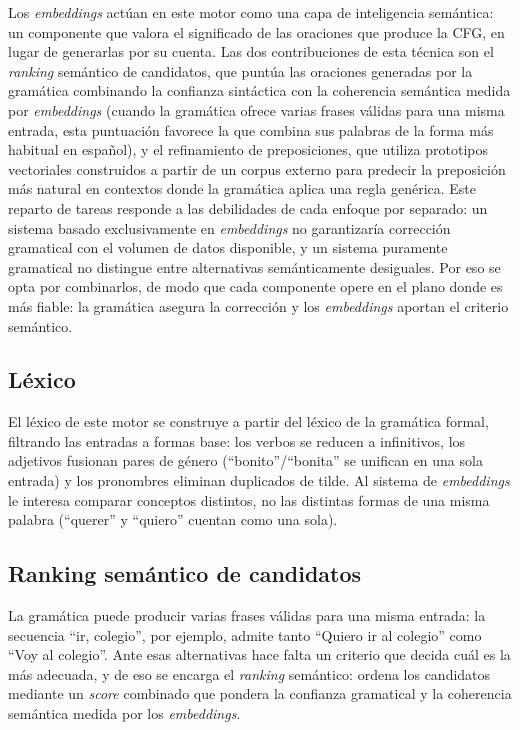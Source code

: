 Los \textit{embeddings} actúan en este motor como una capa de inteligencia semántica: un componente que valora el significado de las oraciones que produce la CFG, en lugar de generarlas por su cuenta. Las dos contribuciones de esta técnica son el \textit{ranking} semántico de candidatos, que puntúa las oraciones generadas por la gramática combinando la confianza sintáctica con la coherencia semántica medida por \textit{embeddings} (cuando la gramática ofrece varias frases válidas para una misma entrada, esta puntuación favorece la que combina sus palabras de la forma más habitual en español), y el refinamiento de preposiciones, que utiliza prototipos vectoriales construidos a partir de un corpus externo para predecir la preposición más natural en contextos donde la gramática aplica una regla genérica. Este reparto de tareas responde a las debilidades de cada enfoque por separado: un sistema basado exclusivamente en \textit{embeddings} no garantizaría corrección gramatical con el volumen de datos disponible, y un sistema puramente gramatical no distingue entre alternativas semánticamente desiguales. Por eso se opta por combinarlos, de modo que cada componente opere en el plano donde es más fiable: la gramática asegura la corrección y los \textit{embeddings} aportan el criterio semántico.

\subsection{Léxico}
\label{sec:f2-lexico}

El léxico de este motor se construye a partir del léxico de la gramática formal, filtrando las entradas a formas base: los verbos se reducen a infinitivos, los adjetivos fusionan pares de género (``bonito''/``bonita'' se unifican en una sola entrada) y los pronombres eliminan duplicados de tilde. Al sistema de \textit{embeddings} le interesa comparar conceptos distintos, no las distintas formas de una misma palabra (``querer'' y ``quiero'' cuentan como una sola).

\subsection{Ranking semántico de candidatos}

La gramática puede producir varias frases válidas para una misma entrada: la secuencia ``ir, colegio'', por ejemplo, admite tanto ``Quiero ir al colegio'' como ``Voy al colegio''. Ante esas alternativas hace falta un criterio que decida cuál es la más adecuada, y de eso se encarga el \textit{ranking} semántico: ordena los candidatos mediante un \textit{score} combinado que pondera la confianza gramatical y la coherencia semántica medida por los \textit{embeddings}.


